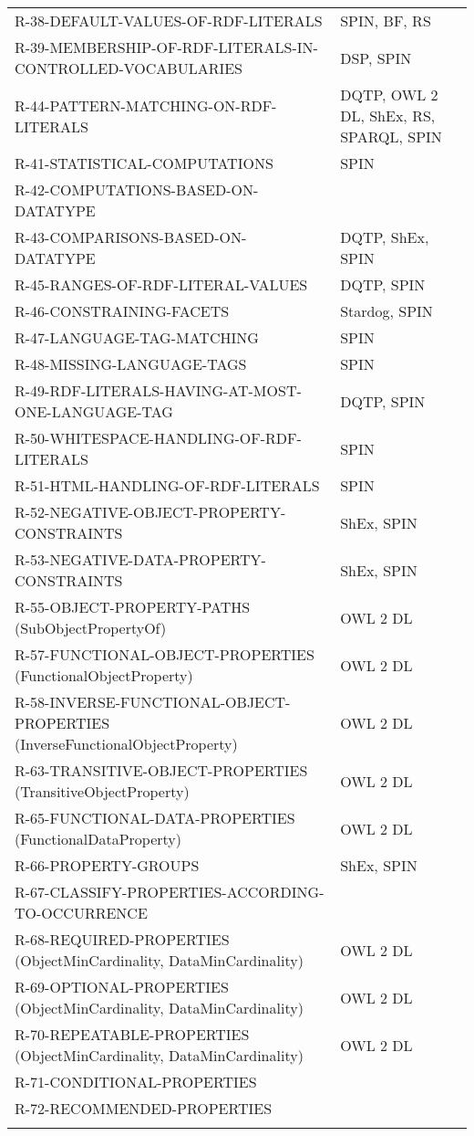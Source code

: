 \documentclass{llncs}
\newcommand{\hr}{\hline\noalign{\smallskip}} %
\begin{document}
\begin{table}
\begin{tabular}{ll}
R-38-DEFAULT-VALUES-OF-RDF-LITERALS & SPIN, BF, RS \\
R-39-MEMBERSHIP-OF-RDF-LITERALS-IN-CONTROLLED-VOCABULARIES & DSP, SPIN \\
R-44-PATTERN-MATCHING-ON-RDF-LITERALS & DQTP, OWL 2 DL, ShEx, RS, SPARQL, SPIN \\
R-41-STATISTICAL-COMPUTATIONS & SPIN \\
R-42-COMPUTATIONS-BASED-ON-DATATYPE & \\
R-43-COMPARISONS-BASED-ON-DATATYPE & DQTP, ShEx, SPIN \\
R-45-RANGES-OF-RDF-LITERAL-VALUES & DQTP, SPIN \\
R-46-CONSTRAINING-FACETS & Stardog, SPIN \\
R-47-LANGUAGE-TAG-MATCHING & SPIN \\
R-48-MISSING-LANGUAGE-TAGS & SPIN \\
R-49-RDF-LITERALS-HAVING-AT-MOST-ONE-LANGUAGE-TAG & DQTP, SPIN \\
R-50-WHITESPACE-HANDLING-OF-RDF-LITERALS & SPIN \\
R-51-HTML-HANDLING-OF-RDF-LITERALS & SPIN \\
R-52-NEGATIVE-OBJECT-PROPERTY-CONSTRAINTS & ShEx, SPIN \\
R-53-NEGATIVE-DATA-PROPERTY-CONSTRAINTS & ShEx, SPIN \\
R-55-OBJECT-PROPERTY-PATHS (SubObjectPropertyOf) & OWL 2 DL \\
R-57-FUNCTIONAL-OBJECT-PROPERTIES (FunctionalObjectProperty) & OWL 2 DL \\
R-58-INVERSE-FUNCTIONAL-OBJECT-PROPERTIES (InverseFunctionalObjectProperty) & OWL 2 DL \\
R-63-TRANSITIVE-OBJECT-PROPERTIES (TransitiveObjectProperty) & OWL 2 DL \\
R-65-FUNCTIONAL-DATA-PROPERTIES (FunctionalDataProperty) & OWL 2 DL \\
R-66-PROPERTY-GROUPS & ShEx, SPIN \\
R-67-CLASSIFY-PROPERTIES-ACCORDING-TO-OCCURRENCE & \\
R-68-REQUIRED-PROPERTIES (ObjectMinCardinality, DataMinCardinality) & OWL 2 DL \\
R-69-OPTIONAL-PROPERTIES  (ObjectMinCardinality, DataMinCardinality) & OWL 2 DL \\
R-70-REPEATABLE-PROPERTIES (ObjectMinCardinality, DataMinCardinality) & OWL 2 DL \\
R-71-CONDITIONAL-PROPERTIES \\
R-72-RECOMMENDED-PROPERTIES \\
\hr
\end{tabular}
\end{table}
\end{document}
